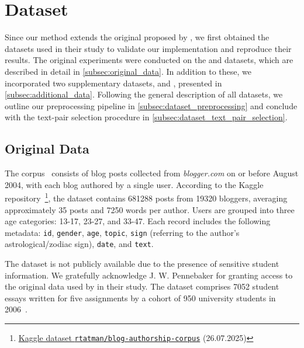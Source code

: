 \section{Dataset}
\label{sec:dataset}

Since our method extends the original \impAppr{} proposed by \citet{koppel_determining_2014}, we first obtained the datasets used in their study to validate our implementation and reproduce their results. 
The original experiments were conducted on the \dataBlog{} and \dataStudent{} datasets, which are described in detail in \autoref{subsec:original_data}. 
In addition to these, we incorporated two supplementary datasets, \dataPan{} and \dataGutenberg{}, presented in \autoref{subsec:additional_data}. 
Following the general description of all datasets, we outline our preprocessing pipeline in \autoref{subsec:dataset_preprocessing} and conclude with the text-pair selection procedure in \autoref{subsec:dataset_text_pair_selection}.


\subsection{Original Data}
\label{subsec:original_data}

The \dataBlog{} corpus~\citep{blog_dataset_2006} consists of blog posts collected from \textit{blogger.com} on or before August 2004, with each blog authored by a single user.
According to the Kaggle repository~\footnote{\href{https://www.kaggle.com/datasets/rtatman/blog-authorship-corpus?resource=download}{Kaggle dataset \texttt{rtatman/blog-authorship-corpus}} (26.07.2025)}, the dataset contains \num{681288} posts from \num{19320} bloggers, averaging approximately 35 posts and \num{7250} words per author.
Users are grouped into three age categories: 13-17, 23-27, and 33-47.
Each record includes the following metadata: \texttt{id}, \texttt{gender}, \texttt{age}, \texttt{topic}, 
\texttt{sign} (referring to the author's astrological/zodiac sign), \texttt{date}, and \texttt{text}.

The \dataStudent{} dataset is not publicly available due to the presence of sensitive student information. 
We gratefully acknowledge J. W. Pennebaker for granting access to the original data used by \citet{koppel_determining_2014} in their study. 
The dataset comprises \num{7052} student essays written for five assignments by a cohort of 950 university students in 2006~\citep{koppel_determining_2014}.

